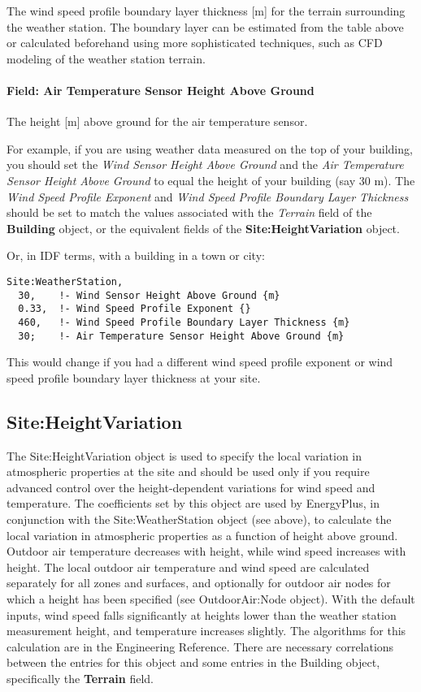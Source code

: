 The wind speed profile boundary layer thickness {[}m{]} for the terrain surrounding the weather station. The boundary layer can be estimated from the table above or calculated beforehand using more sophisticated techniques, such as CFD modeling of the weather station terrain.

\paragraph{Field: Air Temperature Sensor Height Above Ground}\label{field-air-temperature-sensor-height-above-ground}

The height {[}m{]} above ground for the air temperature sensor.

For example, if you are using weather data measured on the top of your building, you should set the \emph{Wind Sensor Height Above Ground} and the \emph{Air Temperature Sensor Height Above Ground} to equal the height of your building (say 30 m). The \emph{Wind Speed Profile Exponent} and \emph{Wind Speed Profile Boundary Layer Thickness} should be set to match the values associated with the \emph{Terrain} field of the \textbf{Building} object, or the equivalent fields of the \textbf{Site:HeightVariation} object.

Or, in IDF terms, with a building in a town or city:

\begin{lstlisting}
Site:WeatherStation,
  30,    !- Wind Sensor Height Above Ground {m}
  0.33,  !- Wind Speed Profile Exponent {}
  460,   !- Wind Speed Profile Boundary Layer Thickness {m}
  30;    !- Air Temperature Sensor Height Above Ground {m}
\end{lstlisting}

This would change if you had a different wind speed profile exponent or wind speed profile boundary layer thickness at your site.

\subsection{Site:HeightVariation}\label{siteheightvariation}

The Site:HeightVariation object is used to specify the local variation in atmospheric properties at the site and should be used only if you require advanced control over the height-dependent variations for wind speed and temperature. The coefficients set by this object are used by EnergyPlus, in conjunction with the Site:WeatherStation object (see above), to calculate the local variation in atmospheric properties as a function of height above ground. Outdoor air temperature decreases with height, while wind speed increases with height. The local outdoor air temperature and wind speed are calculated separately for all zones and surfaces, and optionally for outdoor air nodes for which a height has been specified (see OutdoorAir:Node object). With the default inputs, wind speed falls significantly at heights lower than the weather station measurement height, and temperature increases slightly. The algorithms for this calculation are in the Engineering Reference. There are necessary correlations between the entries for this object and some entries in the Building object, specifically the \textbf{Terrain} field.

